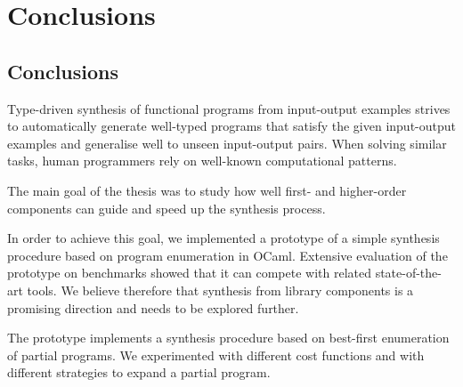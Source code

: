 \chapter{Conclusions} \label{ch:conclusions}

\section{Conclusions}

Type-driven synthesis of functional programs from input-output examples   strives to automatically generate well-typed programs that satisfy the given input-output examples and generalise well to unseen input-output pairs. When solving similar tasks, human programmers rely on well-known computational patterns.


The main goal of the thesis was to study how well first- and higher-order components can guide and speed up the synthesis process.

In order to achieve this goal, we implemented a prototype of a simple synthesis procedure based on program enumeration in OCaml. Extensive evaluation of the prototype on benchmarks showed that it can compete with related state-of-the-art tools. We believe therefore that synthesis from library components is a promising direction and needs to be explored further.

The prototype implements a synthesis procedure based on best-first enumeration of partial programs. We experimented with different cost functions and with different strategies to expand a partial program.

